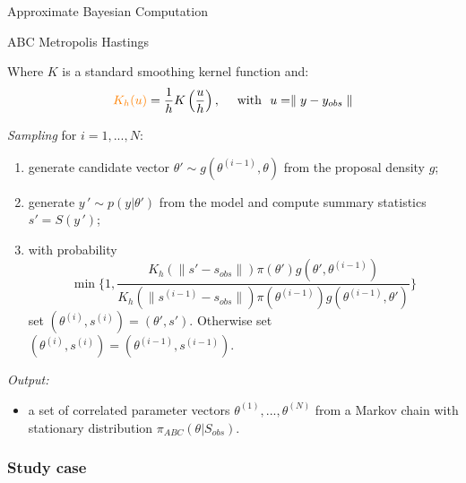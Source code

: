 \begin{section}{Approximate Bayesian Computation}
\begin{frame}{ABC Metropolis Hastings}
{ 
 \vspace{0.7cm}
 Where $K$ is a standard smoothing kernel function and:
 \[ \textcolor{orange}{K_h(u)}  =  \frac{1}{h}  K \left( \frac{u}{h} \right), \quad \text{ with } \  u=\parallel y-y_{obs} \parallel \]
 
 

}


 {
	\emph{Sampling} for $i=1,...,N$:
	\begin{enumerate}
		\item generate candidate vector $\theta' \sim g(\theta^{(i-1)},\theta)$ from the proposal density $g$;
		\item generate $ y\,' \sim p(y|\theta')$ from the model and compute summary statistics  $s' = S(y\,')$;
		\item with probability $$\min \{ 1, \frac{K_h(\parallel s'-s_{obs}\parallel)   \pi(\theta')g(\theta',\theta^{(i-1)})}{K_h(\parallel s^{(i-1)}-s_{obs}\parallel)   \pi(\theta^{(i-1)})g(\theta^{(i-1)},\theta') } \}$$ 
		set $(\theta^{(i)},s^{(i)})=(	\theta',s')$. 
		Otherwise set  $(\theta^{(i)},s^{(i)})=(\theta^{(i-1)},s^{(i-1)})$.
	\end{enumerate}
	
	\emph{Output:}
	\begin{itemize}
		\item a set of correlated parameter vectors $\theta ^ {(1)},..., \theta ^ {(N)}$ from a Markov chain with stationary distribution $\pi_{ABC}(\theta |S_{obs})$.
	\end{itemize}
}
\end{frame}



\begin{frame}
\frametitle{Study case}
\end{frame}
\end{section}
